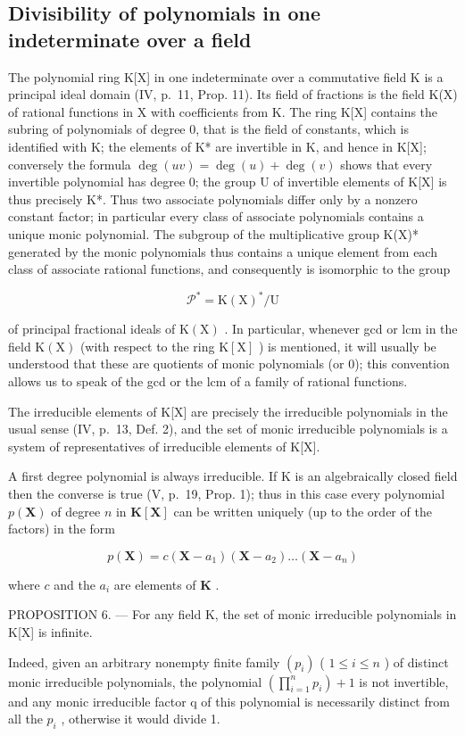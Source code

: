 \subsection{Divisibility of polynomials in one indeterminate over a field}

The polynomial ring K{[}X{]} in one indeterminate over a commutative field K is a principal ideal domain (IV, p.~11, Prop. 11). Its field of fractions is the field K(X) of rational functions in X with coefficients from K. The ring K{[}X{]} contains the subring of polynomials of degree 0, that is the field of constants, which is identified with K; the elements of K* are invertible in K, and hence in K{[}X{]}; conversely the formula \(\deg(uv) = \deg(u) + \deg(v)\) shows that every invertible polynomial has degree 0; the group U of invertible elements of K{[}X{]} is thus precisely K*. Thus two associate polynomials differ only by a nonzero constant factor; in particular every class of associate polynomials contains a unique monic polynomial. The subgroup of the multiplicative group K(X)* generated by the monic polynomials thus contains a unique element from each class of associate rational functions, and consequently is isomorphic to the group

\[
\mathcal {P} ^ {*} = \mathrm{K} (\mathrm{X}) ^ {*} / \mathrm{U}
\]

of principal fractional ideals of \(\mathrm{K}(\mathrm{X})\) . In particular, whenever gcd or lcm in the field \(\mathrm{K}(\mathrm{X})\) (with respect to the ring \(\mathrm{K}[\mathrm{X}]\) ) is mentioned, it will usually be understood that these are quotients of monic polynomials (or 0); this convention allows us to speak of the gcd or the lcm of a family of rational functions.

The irreducible elements of K{[}X{]} are precisely the irreducible polynomials in the usual sense (IV, p.~13, Def. 2), and the set of monic irreducible polynomials is a system of representatives of irreducible elements of K{[}X{]}.

A first degree polynomial is always irreducible. If K is an algebraically closed field then the converse is true (V, p.~19, Prop. 1); thus in this case every polynomial \(p(\mathbf{X})\) of degree \(n\) in \(\mathbf{K}[\mathbf{X}]\) can be written uniquely (up to the order of the factors) in the form

\[
p (\mathbf {X}) = c \left(\mathbf {X} - a _ {1}\right) \left(\mathbf {X} - a _ {2}\right) \dots \left(\mathbf {X} - a _ {n}\right)
\]

where \(c\) and the \(a_{i}\) are elements of \(\mathbf{K}\) .

PROPOSITION 6. --- For any field K, the set of monic irreducible polynomials in K{[}X{]} is infinite.

Indeed, given an arbitrary nonempty finite family \((p_{i})\) ( \(1 \leqslant i \leqslant n\) ) of distinct monic irreducible polynomials, the polynomial \(\left(\prod_{i=1}^{n} p_{i}\right) + 1\) is not invertible, and any monic irreducible factor q of this polynomial is necessarily distinct from all the \(p_{i}\) , otherwise it would divide 1.

